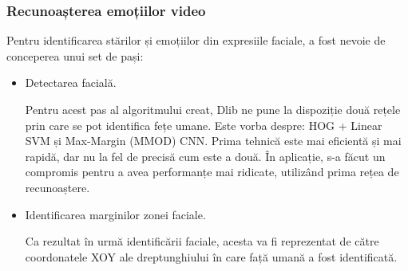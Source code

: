 \documentclass[a4paper, 12pt]{report}
\begin{document}
	\subsubsection{Recunoașterea emoțiilor video}
	Pentru identificarea stărilor și emoțiilor din expresiile faciale, a fost nevoie de conceperea unui set de pași:
	\begin{itemize}
		\item Detectarea facială.
				
		Pentru acest pas al algoritmului creat, Dlib ne pune la dispoziție două rețele prin care se pot identifica fețe umane. Este vorba despre: HOG + Linear SVM și Max-Margin (MMOD) CNN. Prima tehnică este mai eficientă și mai rapidă, dar nu la fel de precisă cum este a două. În aplicație, s-a făcut un compromis pentru a avea performanțe mai ridicate, utilizând prima rețea de recunoaștere. 
		
		\item Identificarea marginilor zonei faciale.
		
		Ca rezultat în urmă identificării faciale, acesta va fi reprezentat de către coordonatele XOY ale dreptunghiului în care față umană a fost identificată.
		

\end{itemize}
\end{document}
